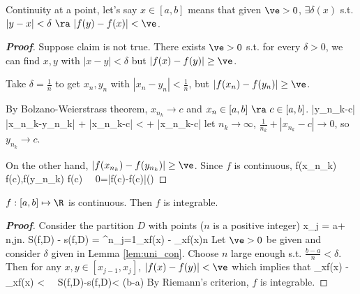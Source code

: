 \begin{remark}
Continuity at a point, let's say $x\in [a,b]$ means that given $\ve>0$, $\exists \delta(x)$ s.t. $|y-x|<\delta \ \ra \ |f(y)-f(x)|<\ve$.
\end{remark}

\begin{proof}[{\bf Proof}]
Suppose claim is not true. There exists $\ve>0$ s.t. for every $\delta>0$, we can find $x,y$ with $|x-y|<\delta$ but $|f(x)-f(y)|\geq \ve$.

Take $\delta = \frac 1n$ to get $x_n,y_n$ with $|x_n-y_n|<\frac 1n$, but $|f(x_n)-f(y_n)|\geq \ve$.

By Bolzano-Weierstrass theorem, $x_{n_k}\to c$ and $x_n \in [a,b]\ \ra \ c\in [a,b]$.
\be
|y_{n_k}-c| \leq |x_{n_k}-y_{n_k}| + |x_{n_k}-c| <  + |x_{n_k}-c|
\ee
let $n_k\to \infty$, $\frac 1{n_k} + |x_{n_k}-c|\to 0$, so $y_{n_k}\to c$. 

On the other hand, $|f(x_{n_k})-f(y_{n_k})| \geq \ve$. Since $f$ is continuous,
\be
f(x_{n_k}) \to f(c),\quad f(y_{n_k}) \to f(c) \ \ra \ 0=|f(c)-f(c)|\geq \ve \quad ()
\ee
\end{proof}

\begin{theorem}
$f:[a,b]\mapsto \R$ is continuous. Then $f$ is integrable.
\end{theorem}

\begin{proof}[{\bf Proof}]
Consider the partition $D$ with points ($n$ is a positive integer)
\be
x_j = a+ n,\leq j\leq n.
\ee
\be
S(f,D) - s(f,D) = \sum^n_{j=1}\lob \sup_{x\in[x_{j-1},x_j]}f(x) - \inf_{x\in[x_{j-1},x_j]}f(x)\rob {}n
\ee
Let $\ve>0$ be given and consider $\delta$ given in Lemma \ref{lem:uni_con}. Choose $n$ large enough s.t. $\frac{b-a}n<\delta$. Then for any $x,y\in [x_{j-1},x_j]$, $|f(x)-f(y)|<\ve$ which implies that
\be
\sup_{x\in[x_{j-1},x_j]}f(x) - \inf_{x\in[x_{j-1},x_j]}f(x) < \ve \ \ra \ S(f,D)-s(f,D)< \ve (b-a)
\ee
By Riemann's criterion, $f$ is integrable.
\end{proof}

